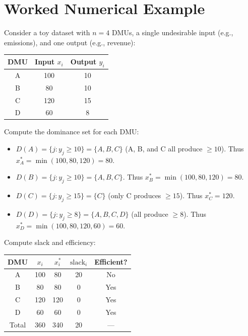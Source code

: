 \documentclass[11pt]{article}
\theoremstyle{definition}
\theoremstyle{plain}
\theoremstyle{remark}
\begin{document}
\section{Worked Numerical Example}

\label{sec:example}

Consider a toy dataset with $n = 4$ DMUs, a single undesirable input (e.g., emissions), and one output (e.g., revenue):

\begin{table}[h]
\centering
\begin{tabular}{ccc}
\toprule
DMU & Input $x_i$ & Output $y_i$ \\
\midrule
A & 100 & 10 \\
B & 80 & 10 \\
C & 120 & 15 \\
D & 60 & 8 \\
\bottomrule
\end{tabular}
\end{table}

Compute the dominance set for each DMU:

\begin{itemize}
\item $D(A) = \{j : y_j \ge 10\} = \{A, B, C\}$ (A, B, and C all produce $\ge 10$). Thus $x_A^* = \min(100, 80, 120) = 80$.
\item $D(B) = \{j : y_j \ge 10\} = \{A, B, C\}$. Thus $x_B^* = \min(100, 80, 120) = 80$.
\item $D(C) = \{j : y_j \ge 15\} = \{C\}$ (only C produces $\ge 15$). Thus $x_C^* = 120$.
\item $D(D) = \{j : y_j \ge 8\} = \{A, B, C, D\}$ (all produce $\ge 8$). Thus $x_D^* = \min(100, 80, 120, 60) = 60$.
\end{itemize}

Compute slack and efficiency:

\begin{table}[h]
\centering
\begin{tabular}{ccccc}
\toprule
DMU & $x_i$ & $x_i^*$ & $\text{slack}_i$ & Efficient? \\
\midrule
A & 100 & 80 & 20 & No \\
B & 80 & 80 & 0 & Yes \\
C & 120 & 120 & 0 & Yes \\
D & 60 & 60 & 0 & Yes \\
\midrule
Total & 360 & 340 & 20 & --- \\
\bottomrule
\end{tabular}
\end{table}
\end{document}
